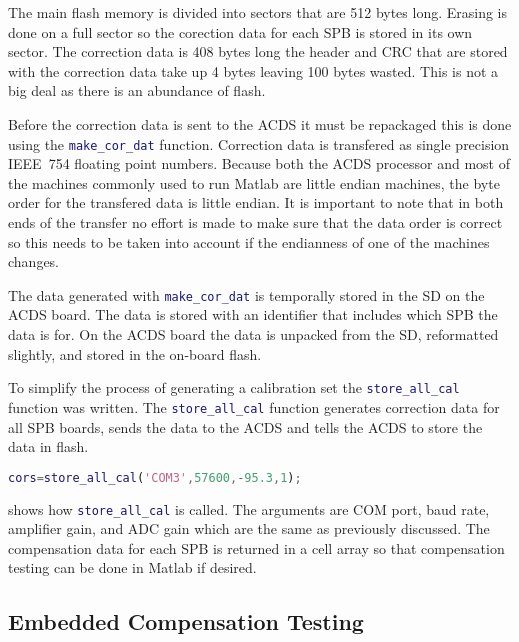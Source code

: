 The main flash memory is divided into sectors that are 512 bytes long. Erasing is done on a full sector so the corection data for each \ac{SPB} is stored in its own sector. The correction data is 408 bytes long the header and \ac{CRC} that are stored with the correction data take up 4 bytes leaving 100 bytes wasted. This is not a big deal as there is an abundance of flash.

Before the correction data is sent to the \ac{ACDS} it must be repackaged this is done using the \lstinline[style=code,language=Matlab]$make_cor_dat$ function. Correction data is transfered as single precision IEEE~754 floating point numbers. Because both the \ac{ACDS} processor and most of the machines commonly used to run Matlab are little endian machines, the byte order for the transfered data is little endian. It is important to note that in both ends of the transfer no effort is made to make sure that the data order is correct so this needs to be taken into account if the endianness of one of the machines changes.

The data generated with \lstinline[style=code,language=Matlab]$make_cor_dat$ is temporally stored in the \ac{SD} on the \ac{ACDS} board. The data is stored with an identifier that includes which \ac{SPB} the data is for. On the \ac{ACDS} board the data is unpacked from the \ac{SD}, reformatted slightly, and stored in the on-board flash. 

To simplify the process of generating a calibration set the \lstinline[style=code,language=Matlab]$store_all_cal$ function was written. The \lstinline[style=code,language=Matlab]$store_all_cal$ function generates correction data for all \ac{SPB} boards, sends the data to the \ac{ACDS} and tells the \ac{ACDS} to store the data in flash. 

\begin{lstlisting}[style=code,caption={Generating and sending compensation data to the \ac{ACDS}},label={lst:st-cal},language=Matlab]
cors=store_all_cal('COM3',57600,-95.3,1);
\end{lstlisting}

 shows how \lstinline[style=code,language=Matlab]$store_all_cal$ is called. The arguments are COM port, baud rate, amplifier gain, and \ac{ADC} gain which are the same as previously discussed. The compensation data for each \ac{SPB} is returned in a cell array so that compensation testing can be done in Matlab if desired.

\subsection{Embedded Compensation Testing}

